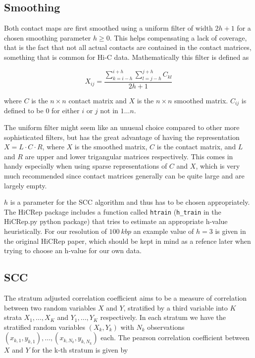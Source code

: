 \documentclass[a4paper,11pt,oneside,final,english,toc=bib,draft]{scrbook}
\begin{document}
\subsection{Smoothing} %
\label{subsec:smoothing}

Both contact maps are first smoothed using a uniform filter of width \(2h+1\) for a chosen smoothing parameter \(h \geq 0\). This helps compensating a lack of coverage, that is the fact that not all actual contacts are contained in the contact matrices, something that is common for Hi-C data. Mathematically this filter is defined as

\[
  X_{ij} = \frac{ \sum_{k=i-h}^{i+h} \sum_{l=j-h}^{j+h} C_{kl} }{ 2h+1 }
\]

where \(C\) is the \(n \times n\) contact matrix and \(X\) is the \(n \times n\) smoothed matrix. \(C_{ij}\) is defined to be 0 for either \(i\) or \(j\) not in \(1 \dots n\).

The uniform filter might seem like an unusual choice compared to other more sophisticated filters, but has the great advantage of having the representation \( X = L \cdot C \cdot R \), where \(X\) is the smoothed matrix, \(C\) is the contact matrix, and \(L\) and \(R\) are upper and lower trigangular matrices respectively. This comes in handy especially when using sparse representations of \(C\) and \(X\), which is very much recommended since contact matrices generally can be quite large and are largely empty.

\(h\) is a parameter for the SCC algorithm and thus has to be chosen appropriately. The HiCRep package includes a function called \verb|htrain| (\verb|h_train| in the HiCRep.py python package) that tries to estimate an appropriate h-value heuristically. For our resolution of \(\SI{100}{kbp}\) an example value of \( h = 3 \) is given in the original HiCRep paper, which should be kept in mind as a refence later when trying to choose an h-value for our own data.


\subsection{SCC} %
\label{subsec:scc}

The stratum adjusted correlation coefficient aims to be a measure of correlation between two random variables \(X\) and \(Y\), stratified by a third variable into \(K\) strata \(X_1, \dots, X_K\) and \(Y_1, \dots, Y_K\) respectively. In each stratum we have the stratified random variables \((X_k, Y_k)\) with \(N_k\) observations \( (x_{k,1}, y_{k,1}), \dots, (x_{k,N_k}, y_{k,N_k}) \) each. The pearson correlation coefficient between \(X\) and \(Y\) for the k-th stratum is given by
\end{document}
